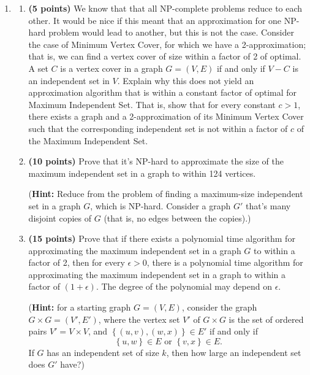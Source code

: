 \documentclass[11pt]{article}
\begin{document}
\begin{enumerate}
\item
\begin{enumerate}
 \item
 {\bf (5 points)}
We know that that all NP-complete problems reduce to each other.  It
 would be nice if this meant that an approximation for one NP-hard
 problem would lead to another, but this is not the case.  Consider
 the case of Minimum Vertex Cover, for which we have a 2-approximation;
 that is, we can find a vertex cover of size within a factor of 2 of optimal.
A set $C$ is a vertex cover in a graph $G=(V,E)$ if and only if $V-C$ is an
 independent set in $V$.  Explain why this does not yield an
 approximation algorithm that is within a constant factor of optimal
 for Maximum Independent Set.  That is, show that for every constant $c > 1$,
 there exists a graph and a 2-approximation of its Minimum Vertex Cover
 such that the corresponding independent set is not
 within a factor of $c$ of the Maximum Independent Set.

\item
{\bf (10 points)}
Prove that it's NP-hard to approximate the size of the maximum independent set in a graph to within 124 vertices.

({\bf Hint:} Reduce from the problem of finding a maximum-size independent set in a graph $G$, which is NP-hard.
Consider a graph $G'$ that's many disjoint copies of $G$ (that is, no edges between the copies).)

\item
{\bf (15 points)}
Prove that if there exists a polynomial time algorithm for
  approximating the maximum independent set in a graph $G$ to within a factor of 2,
  then for every $\epsilon > 0$, there is a polynomial time algorithm for approximating the maximum
  independent set in a graph to within a factor of $(1+\epsilon)$. 
  The degree of the polynomial may depend on $\epsilon$.  

({\bf Hint:}  for a starting graph $G=(V,E)$, consider
  the graph $G \times G  = (V',E')$, where the vertex set $V'$ of $G \times G$ is the
  set of ordered pairs $V' = V \times V$, and $\left \{(u,v),(w,x) \right \} \in E'$ if and
  only if $$\left \{u,w\right \} \in E \mbox{ or }
\left \{ v,x \right \} \in E.$$
  If $G$ has an independent set of size $k$, then how large an independent set does $G'$ have?)

\end{enumerate}


\end{enumerate}
\end{document}
